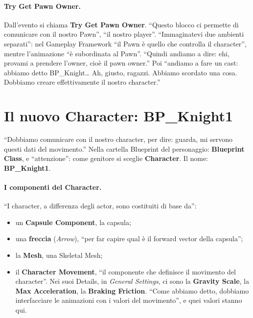 \paragraph{Try Get Pawn Owner.} Dall'evento si chiama \textbf{Try Get Pawn Owner}.
``Questo blocco ci permette di comunicare con il nostro Pawn'', ``il nostro player''.
``Immaginatevi due ambienti separati'': nel Gameplay Framework ``il Pawn è quello che
controlla il character'', mentre l'animazione ``è subordinata al Pawn''. ``Quindi andiamo
a dire: ehi, provami a prendere l'owner, cioè il pawn owner.'' Poi ``andiamo a fare un
cast: abbiamo detto BP\_Knight\ldots{} Ah, giusto, ragazzi. Abbiamo scordato una cosa.
Dobbiamo creare effettivamente il nostro character.''

\section{Il nuovo Character: BP\_Knight1}
\label{ue8:sec:character}

``Dobbiamo comunicare con il nostro character, per dire: guarda, mi servono questi dati
del movimento.'' Nella cartella Blueprint del personaggio: \textbf{Blueprint Class}, e
``attenzione'': come genitore si sceglie \textbf{Character}. Il nome:
\textbf{BP\_Knight1}.

\paragraph{I componenti del Character.} ``I character, a differenza degli actor, sono
costituiti di base da'':
\begin{itemize}
  \item un \textbf{Capsule Component}, la capsula;
  \item una \textbf{freccia} (\emph{Arrow}), ``per far capire qual è il forward vector
        della capsula'';
  \item la \textbf{Mesh}, una Skeletal Mesh;
  \item il \textbf{Character Movement}, ``il componente che definisce il movimento del
        character''. Nei suoi Details, in \emph{General Settings}, ci sono la
        \textbf{Gravity Scale}, la \textbf{Max Acceleration}, la \textbf{Braking
        Friction}. ``Come abbiamo detto, dobbiamo interfacciare le animazioni con i
        valori del movimento'', e quei valori stanno qui.
\end{itemize}

